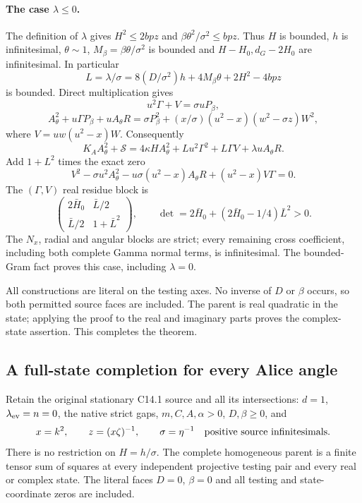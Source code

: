 \paragraph{The case $\lambda\le0$.}
The definition of $\lambda$ gives
$H^2\le2bpz$ and $\beta\theta^2/\sigma^2\le bpz$.
Thus $H$ is bounded, $h$ is infinitesimal, $\theta\sim1$,
$M_\beta=\beta\theta/\sigma^2$ is bounded and
$H-H_0,d_G-2H_0$ are infinitesimal. In particular
\[
 L=\lambda/\sigma
   =8(D/\sigma^2)h+4M_\beta\theta+2H^2-4bpz
\]
is bounded. Direct multiplication gives
\[
 u^2\Gamma+V=\sigma uP_\beta,
\]
\[
 A_\theta^2+u\Gamma P_\beta+uA_\theta R
      =\sigma P_\beta^2+(x/\sigma)(u^2-x)(w^2-\sigma z)W^2,
\]
where $V=uw(u^2-x)W$. Consequently
\[
 K_AA_\theta^2+\mathscr S
 =4\kappa H A_\theta^2+Lu^2\Gamma^2+L\Gamma V
                                      +\lambda uA_\theta R.
\]
Add $1+L^2$ times the exact zero
\[
 V^2-\sigma u^2A_\theta^2-u\sigma(u^2-x)A_\theta R
                                      +(u^2-x)V\Gamma=0.
\]
The $(\Gamma,V)$ real residue block is
\[
 \begin{pmatrix}2\bar H_0&\bar L/2\\
                 \bar L/2&1+\bar L^2\end{pmatrix},\qquad
 \det=2\bar H_0+(2\bar H_0-1/4)\bar L^2>0.
\]
The $N_x$, radial and angular blocks are strict; every remaining
cross coefficient, including both complete Gamma normal terms,
is infinitesimal. The bounded-Gram fact proves this case, including
$\lambda=0$.

All constructions are literal on the testing axes. No inverse of
$D$ or $\beta$ occurs, so both permitted source faces are included.
The parent is real quadratic in the state; applying the proof to
the real and imaginary parts proves the complex-state assertion.
This completes the theorem.
\subsection{A full-state completion for every Alice angle}
\label{sec:c1-c141-all-alice}

\begin{theorem}\label{thm:c1-c141-all-tests}
Retain the original stationary C14.1 source and all its intersections:
$d=1$, $\lambda_{\rm ev}=n=0$, the native strict gaps,
$m,C,A,\alpha>0$, $D,\beta\ge0$, and
\[
 x=k^2,\qquad z=(x\zeta)^{-1},\qquad\sigma=\eta^{-1}
          \quad\hbox{positive source infinitesimals}.
\]
There is no restriction on $H=h/\sigma$. The complete homogeneous
parent is a finite tensor sum of squares at every independent
projective testing pair and every real or complex state. The literal
faces $D=0$, $\beta=0$ and all testing and state-coordinate zeros
are included.
\end{theorem}

